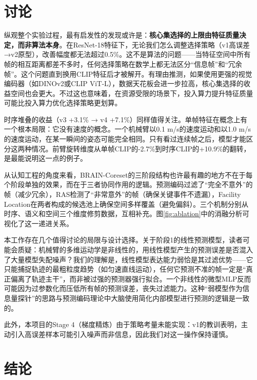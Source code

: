 \documentclass[11pt,a4paper,fontset=none]{ctexart}
\begin{document}
\section{讨论}

纵观整个实验过程，最有启发性的发现或许是：\textbf{核心集选择的上限由特征质量决定，而非算法本身}。在ResNet-18特征下，无论我们怎么调整选择策略（v1高误差→v2原型），改善幅度都无法超过0.5\%。这不是算法的问题——当特征空间中所有帧的相互距离都差不多时，任何选择策略在数学上都无法区分“信息帧”和“冗余帧”。这个问题直到换用CLIP特征后才被解开。有理由推测，如果使用更强的视觉编码器（如DINOv2或CLIP ViT-L），数据天花板会进一步拉高，核心集选择的收益空间也会更大。不过这也意味着，在资源受限的场景下，投入算力提升特征质量可能比投入算力优化选择策略更划算。

时序堆叠的收益（v3 +3.1\% → v4 +7.1\%）同样值得关注。单帧特征在概念上有一个根本局限：它没有速度的概念。一个机械臂以0.1 m/s的速度运动和以1.0 m/s的速度运动，在某一瞬间的姿态可能完全相同。只有看过连续帧之后，模型才能区分这两种情况。前臂旋转维度从单帧CLIP的-2.7\%到时序CLIP的+10.9\%的翻转，是最能说明这一点的例子。

从认知工程的角度来看，BRAIN-Coreset的三阶段结构也许最有趣的地方不在于每个阶段单独的效果，而在于三者协同作用的逻辑。预测编码过滤了“完全不意外”的帧（减少冗余），RAS检测了“非常意外”的帧（确保关键事件不遗漏），Facility Location在两者构成的候选池上确保空间多样覆盖（避免偏斜）。三个机制分别从时序、语义和空间三个维度修剪数据，互相补充。图\ref{fig:ablation}中的消融分析可视化了这一递进关系。

本工作存在几个值得讨论的局限与设计选择。关于阶段1的线性预测模型，读者可能会质疑：机械臂的多维运动学是非线性的，用线性模型产生的预测误差是否混入了大量模型失配噪声？我们的理解是，线性模型表达能力弱恰是其过滤优势——它只能捕捉轨迹的最粗粒度趋势（如匀速直线运动），任何它预测不准的帧一定是“真正偏离了轨迹主干”，而非被过强的预测器强行拟合。一个非线性的微型MLP反而可能因为过参数化而压低所有帧的预测误差，丧失过滤能力。这种“弱模型作为信息量探针”的思路与预测编码理论中大脑使用简化内部模型进行预测的逻辑是一致的。

此外，本项目的Stage 4（梯度精炼）由于策略考量未能实现：v1的教训表明，主动引入高误差样本可能引入噪声而非信息，因此我们对这一操作保持谨慎。

\section{结论}
\end{document}
